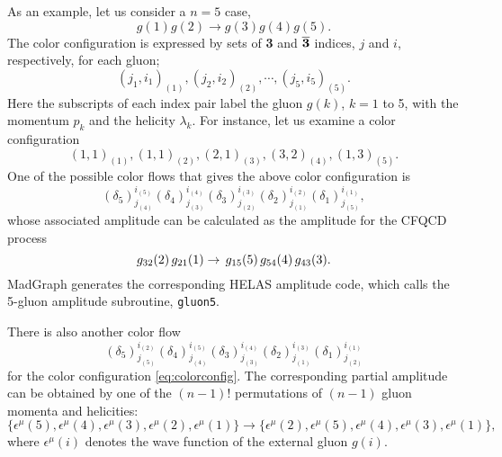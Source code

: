 \documentclass[a4paper,11pt]{article}
\begin{document}
As an example, let us consider a $n=5$ case,
\begin{equation}
g(1)g(2)\rightarrow g(3)g(4)g(5).
\end{equation}
 The color configuration is expressed by sets of {\bf 3} and
$\overline{\bf 3}$ indices, $j$ and $i$, respectively, for each gluon;
\begin{equation}
(j_1,i_1)_{(1)}, (j_2,i_2)_{(2)}, \cdots, (j_5,i_5)_{(5)}.
\end{equation}
Here the subscripts of each index pair label the gluon $g(k)$, $k=1$ to 5,
with the momentum $p_k$ and the helicity $\lambda_k$. For instance, let us
examine a color
configuration
\begin{equation}
(1,1)_{(1)}, (1,1)_{(2)},(2,1)_{(3)},(3,2)_{(4)},(1,3)_{(5)}.
\label{eq:colorconfig}
\end{equation}
  One of the possible color flows that gives the above color
  configuration is
\begin{equation}
(\delta_5)^{i_{(5)}}_{j_{(4)}}(\delta_4)^{i_{(4)}}_{j_{(3)}}(\delta_3)^{i_{(3)}}_{j_{(2)}}(\delta_2)^{i_{(2)}}_{j_{(1)}}(\delta_1)^{i_{(1)}}_{j_{(5)}},
\label{eq:cf1}
\end{equation}
 whose associated amplitude can be calculated as the amplitude for the
 CFQCD process\\
\begin{equation}
 g_{32}(2)\,g_{21}(1)\rightarrow \,g_{15}(5) \,g_{54}(4) \,g_{43}(3). \\
\end{equation}
MadGraph generates the corresponding HELAS amplitude code, which calls the
5-gluon amplitude subroutine, {\tt gluon5}.

There is also another color flow
\begin{equation}
(\delta_5)^{i_{(2)}}_{j_{(5)}}(\delta_4)^{i_{(5)}}_{j_{(4)}}(\delta_3)^{i_{(4)}}_{j_{(3)}}(\delta_2)^{i_{(3)}}_{j_{(1)}}(\delta_1)^{i_{(1)}}_{j_{(2)}}
\label{eq:cf2}
\end{equation}
for the color configuration \eqref{eq:colorconfig}. The corresponding partial
amplitude can be obtained by one of the $(n-1)!$ permutations of $(n-1)$ gluon momenta and
helicities:
\begin{equation}
\bigl\{\epsilon^{\mu}(5),\epsilon^{\mu}(4),\epsilon^{\mu}(3),\epsilon^{\mu}(2),\epsilon^{\mu}(1)\bigr\}\rightarrow
\bigl\{\epsilon^{\mu}(2),\epsilon^{\mu}(5),\epsilon^{\mu}(4),\epsilon^{\mu}(3),\epsilon^{\mu}(1)\bigr\},
\end{equation}
where $\epsilon^{\mu}(i)$ denotes the wave function of the external
 gluon $g(i)$.
\end{document}
